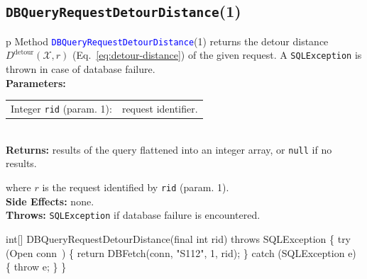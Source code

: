 \subsection{\texttt{DBQueryRequestDetourDistance}(1)}
\begin{tabular}{p{\textwidth}}
\toprule
{}
Method \textcolor{blue}{{\tt{}\protect{}DBQueryRequestDetourDistance}}(1) returns the
detour distance $D^\textrm{detour}(\mathcal{X},r)$
(Eq.~\ref{eq:detour-distance}) of the given request.
A {\tt{}SQLException} is thrown in case of database failure.\\
\midrule
\textbf{Parameters:}\\
\begin{tabular}{lp{116mm}}
Integer {\tt{}rid} (param. 1):&request identifier.
\end{tabular}\\
\textbf{Returns:} results of the query flattened into an integer array,
or {\tt{}null} if no results.


where $r$ is the request identified by {\tt{}rid} (param. 1).\\
\textbf{Side Effects:} none.\\
\textbf{Throws:} {\tt{}SQLException} if database failure is encountered.\\
\bottomrule
\end{tabular}
\nwenddocs{}\endmoddef{}
int[] DBQueryRequestDetourDistance(final int rid) throws SQLException \{
  try (\LA{}Open \code{}conn\edoc{}~{\nwtagstyle{}}\RA{}) \{
    return DBFetch(conn, "S112", 1, rid);
  \} catch (SQLException e) \{
    throw e;
  \}
\}
\eatline
{}\nwendcode{}\nwdocspar
